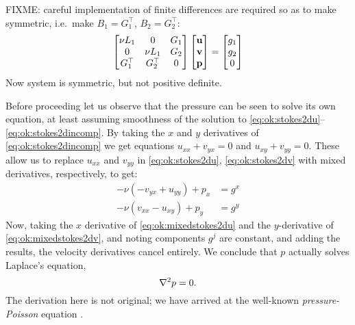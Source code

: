 FIXME: careful implementation of finite differences are required so as to make symmetric, i.e.~make $B_1=G_1^\top$, $B_2=G_2^\top$:
    $$\begin{bmatrix}
    \nu L_1 & 0 & G_1 \\
    0 & \nu L_1 & G_2 \\
    G_1^\top & G_2^\top & 0
    \end{bmatrix}
    \begin{bmatrix}
    \mathbf{u} \\ \mathbf{v} \\ \mathbf{p}
    \end{bmatrix}
    =
    \begin{bmatrix}
    g_1 \\ g_2 \\ 0
    \end{bmatrix}$$
Now system is symmetric, but not positive definite.

Before proceeding let us observe that the pressure can be seen to solve its own equation, at least assuming smoothness of the solution to \eqref{eq:ok:stokes2du}--\eqref{eq:ok:stokes2dincomp}.  By taking the $x$ and $y$ derivatives of \eqref{eq:ok:stokes2dincomp} we get equations $u_{xx} + v_{yx} = 0$ and $u_{xy} + v_{yy} = 0$.  These allow us to replace $u_{xx}$ and $v_{yy}$ in \eqref{eq:ok:stokes2du}, \eqref{eq:ok:stokes2dv} with mixed derivatives, respectively, to get:
\begin{align}
-\nu \left(-v_{yx} + u_{yy}\right) + p_x &= g^x \label{eq:ok:mixedstokes2du} \\
-\nu \left(v_{xx} - u_{xy}\right) + p_y &= g^y \label{eq:ok:mixedstokes2dv}
\end{align}
Now, taking the $x$ derivative of \eqref{eq:ok:mixedstokes2du} and the $y$-derivative of \eqref{eq:ok:mixedstokes2dv}, and noting components $g^j$ are constant, and adding the results, the velocity derivatives cancel entirely.  We conclude that $p$ actually solves Laplace's equation,
\begin{equation}
\nabla^2 p = 0. \label{eq:ok:pressurepoisson}
\end{equation}
The derivation here is not original; we have arrived at the well-known \emph{pressure-Poisson} equation \citep[FIXME: check]{Ockendonetal2003}.

